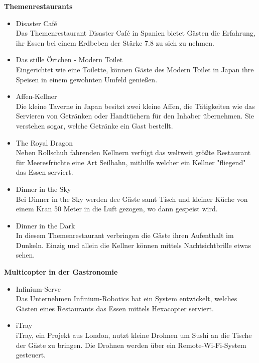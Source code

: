   \textbf{Themenrestaurants}
  \begin{itemize}
    \item Disaster Café\\
    Das Themenrestaurant Disaster Café in Spanien bietet Gästen die Erfahrung, ihr Essen bei einem Erdbeben
    der Stärke 7.8 zu sich zu nehmen.

    \item Das stille Örtchen - Modern Toilet\\
    Eingerichtet wie eine Toilette, können Gäste des Modern Toilet in Japan ihre Speisen in einem gewohnten Umfeld genießen.

    \item Affen-Kellner\\
    Die kleine Taverne in Japan besitzt zwei kleine Affen, die Tätigkeiten wie das Servieren von Getränken oder Handtüchern
    für den Inhaber übernehmen. Sie verstehen sogar, welche Getränke ein Gast bestellt.

    \item The Royal Dragon\\
    Neben Rollschuh fahrenden Kellnern verfügt das weltweit größte Restaurant für Meeresfrüchte eine
    Art Seilbahn, mithilfe welcher ein Kellner "fliegend" das Essen serviert.

    \item Dinner in the Sky\\
    Bei Dinner in the Sky werden dee Gäste samt Tisch und kleiner Küche von einem Kran 50 Meter
    in die Luft gezogen, wo dann gespeist wird.

    \item Dinner in the Dark\\
    In diesem Themenrestaurant verbringen die Gäste ihren Aufenthalt im Dunkeln. Einzig und allein die
    Kellner können mittels Nachtsichtbrille etwas sehen.
  \end{itemize}

  \textbf{Multicopter in der Gastronomie}
  \begin{itemize}
      \item{Infinium-Serve}\\
      Das Unternehmen Infinium-Robotics hat ein System entwickelt, welches Gästen eines Restaurants
      das Essen mittels Hexacopter serviert.

      \item{iTray}\\
      iTray, ein Projekt aus London, nutzt kleine Drohnen um Sushi an die Tische der Gäste zu bringen.
      Die Drohnen werden über ein Remote-Wi-Fi-System gesteuert.

  \end{itemize}


